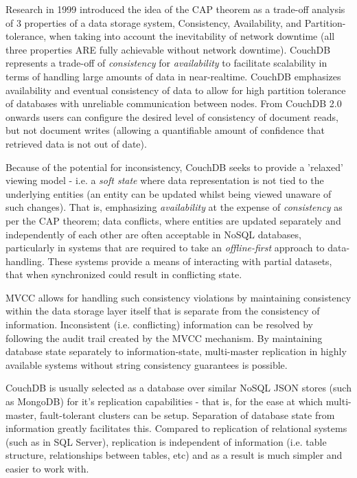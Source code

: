 Research in 1999 \cite{cap} introduced the idea of the CAP theorem as a trade-off analysis of 3 properties of a data storage system, Consistency, Availability, and Partition-tolerance, when taking into account the inevitability of network downtime (all three properties ARE fully achievable without network downtime). CouchDB represents a trade-off of \textit{consistency} for \textit{availability} to facilitate scalability in terms of handling large amounts of data in near-realtime. CouchDB emphasizes availability and eventual consistency of data to allow for high partition tolerance of databases with unreliable communication between nodes. From CouchDB 2.0 onwards users can configure the desired level of consistency of document reads, but not document writes (allowing a quantifiable amount of confidence that retrieved data is not out of date).

Because of the potential for inconsistency, CouchDB seeks to provide a 'relaxed' viewing model - i.e. a \textit{soft state} where data representation is not tied to the underlying entities (an entity can be updated whilst being viewed unaware of such changes). That is, emphasizing \textit{availability} at the expense of \textit{consistency} as per the CAP theorem; data conflicts, where entities are updated separately and independently of each other are often acceptable in NoSQL databases, particularly in systems that are required to take an \textit{offline-first} approach to data-handling. These systems provide a means of interacting with partial datasets, that when synchronized could result in conflicting state.

MVCC allows for handling such consistency violations by maintaining consistency within the data storage layer itself that is separate from the consistency of information. Inconsistent (i.e. conflicting) information can be resolved by following the audit trail created by the MVCC mechanism. By maintaining database state separately to information-state, multi-master replication in highly available systems without string consistency guarantees is possible.

CouchDB is usually selected as a database over similar NoSQL JSON stores (such as MongoDB) for it's replication capabilities - that is, for the ease at which multi-master, fault-tolerant clusters can be setup. Separation of database state from information greatly facilitates this. Compared to replication of relational systems (such as in SQL Server), replication is independent of information (i.e. table structure, relationships between tables, etc) and as a result is much simpler and easier to work with.

